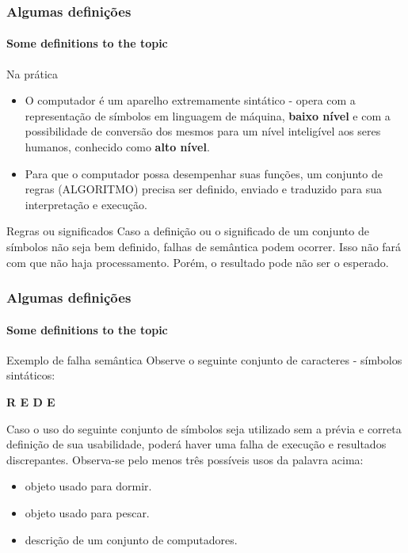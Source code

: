 \begin{frame}[t]
    \frametitle{Algumas definições}
    \framesubtitle{Some definitions to the topic}
    \begin{block}{Na prática}
        \begin{itemize}
            \item O computador é um aparelho extremamente sintático - opera com a representação de símbolos em linguagem de máquina, \textbf{baixo nível} e com a possibilidade de conversão dos mesmos para um nível inteligível aos seres humanos, conhecido como \textbf{alto nível}.
            \item Para que o computador possa desempenhar suas funções, um conjunto de regras (ALGORITMO) precisa ser definido, enviado e traduzido para sua interpretação e execução.
        \end{itemize}
    \end{block}
    \begin{block}{Regras ou significados}
        Caso a definição ou o significado de um conjunto de símbolos não seja bem definido, falhas de semântica podem ocorrer. Isso não fará com que não haja processamento. Porém, o resultado pode não ser o esperado.
    \end{block}
\end{frame}
%
\begin{frame}[t]
    \frametitle{Algumas definições}
    \framesubtitle{Some definitions to the topic}
    \begin{block}{Exemplo de falha semântica}
        Observe o seguinte conjunto de caracteres - símbolos sintáticos:
        \begin{center}
            \textbf{R  E  D  E}
        \end{center}
    \end{block}
    \begin{exampleblock}{}
        \indent Caso o uso do seguinte conjunto de símbolos seja utilizado sem a prévia e correta definição de sua usabilidade, poderá haver uma falha de execução e resultados discrepantes. Observa-se pelo menos três possíveis usos da palavra acima:
        \begin{itemize}
            \item objeto usado para dormir.
            \item objeto usado para pescar.
            \item descrição de um conjunto de computadores.
        \end{itemize}
    \end{exampleblock}
\end{frame}
%
